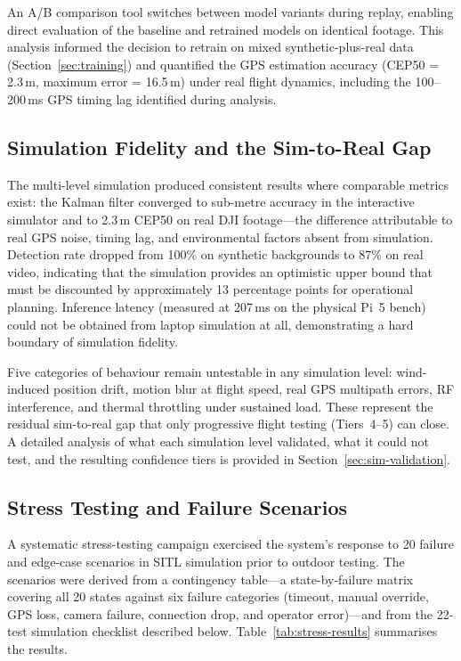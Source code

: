 An A/B comparison tool switches between model variants during replay, enabling direct evaluation of the baseline and retrained models on identical footage. This analysis informed the decision to retrain on mixed synthetic-plus-real data (Section~\ref{sec:training}) and quantified the GPS estimation accuracy (CEP50 = 2.3\,m, maximum error = 16.5\,m) under real flight dynamics, including the 100--200\,ms GPS timing lag identified during analysis.

\subsection{Simulation Fidelity and the Sim-to-Real Gap}\label{sec:sim-fidelity-summary}

The multi-level simulation produced consistent results where comparable metrics exist: the Kalman filter converged to sub-metre accuracy in the interactive simulator and to 2.3\,m CEP50 on real DJI footage---the difference attributable to real GPS noise, timing lag, and environmental factors absent from simulation.  Detection rate dropped from 100\% on synthetic backgrounds to 87\% on real video, indicating that the simulation provides an optimistic upper bound that must be discounted by approximately 13 percentage points for operational planning.  Inference latency (measured at 207\,ms on the physical Pi~5 bench) could not be obtained from laptop simulation at all, demonstrating a hard boundary of simulation fidelity.

Five categories of behaviour remain untestable in any simulation level: wind-induced position drift, motion blur at flight speed, real GPS multipath errors, RF interference, and thermal throttling under sustained load.  These represent the residual sim-to-real gap that only progressive flight testing (Tiers~4--5) can close.  A detailed analysis of what each simulation level validated, what it could not test, and the resulting confidence tiers is provided in Section~\ref{sec:sim-validation}.

\subsection{Stress Testing and Failure Scenarios}\label{sec:stress}

A systematic stress-testing campaign exercised the system's response to 20 failure and edge-case scenarios in SITL simulation prior to outdoor testing. The scenarios were derived from a contingency table---a state-by-failure matrix covering all 20 states against six failure categories (timeout, manual override, GPS loss, camera failure, connection drop, and operator error)---and from the 22-test simulation checklist described below. Table~\ref{tab:stress-results} summarises the results.


